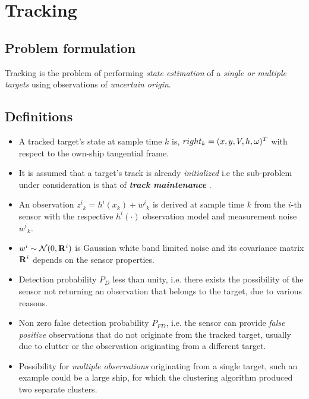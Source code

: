 \chapter{Tracking}\label{ch:Tracking}

\section{Problem formulation}

Tracking is the problem of performing \emph{state estimation} of a \emph{single or multiple targets} using observations of \emph{uncertain origin}.

\section{Definitions}

\begin{itemize}
	\item A tracked target's state at sample time $k$ is, $\\right _k=(x,y,V,h,\omega)^T$ with respect to the own-ship tangential frame.
	\item It is assumed that a target's track is already \emph{initialized} i.e the sub-problem under consideration is that of \emph{\textbf{track maintenance}} .
	\item An observation ${z^i}_k = h^i(x_k) + {w^i}_k$ is derived at sample time $k$ from the $i$-th sensor with the respective $h^i(\cdot)$ observation model and measurement noise ${w^i}_k$.
	\item $w^i \sim \mathcal{N}(0, \mathbf{R}^i)$ is Gaussian white band limited noise and its covariance matrix $\mathbf{R}^i$ depends on the sensor properties.
	\item Detection probability $P_D$ less than unity, i.e. there exists the possibility of the sensor not returning an observation that belongs to the target, due to various reasons.
	\item Non zero false detection probability $P_{FD}$, i.e. the sensor can provide  \emph{false positive} observations that do not originate from the tracked target, usually due to clutter or the observation originating from a different target.
	\item Possibility for \emph{multiple observations} originating from a single target, such an example could be a large ship, for which the clustering algorithm produced two separate clusters.
\end{itemize}

